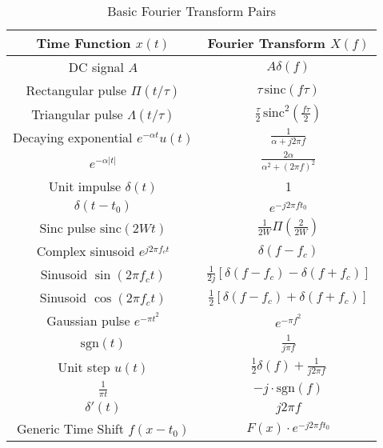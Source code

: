 \documentclass[10pt]{article}
\begin{document}
\begin{table}[h!]
    \centering
    \renewcommand{\arraystretch}{1.5}
    \begin{tabular}{c|c}
        \hline
        \textbf{Time Function \( x(t) \)} & \textbf{Fourier Transform \( X(f) \)} \\
        \hline
        DC signal \( A \) & \( A \delta(f) \) \\
        \hline
        Rectangular pulse \( \Pi(t/\tau) \) & \( \tau \, \text{sinc}(f \tau) \) \\
        \hline
        Triangular pulse \( \Lambda(t/\tau) \) & \( \frac{\tau}{2} \, \text{sinc}^2\left(\frac{f \tau}{2}\right) \) \\
        \hline
        Decaying exponential \( e^{-\alpha t} u(t) \) & \( \frac{1}{\alpha + j2\pi f} \) \\
        \hline
        \( e^{-\alpha |t|} \) & \( \frac{2\alpha}{\alpha^2 + (2\pi f)^2} \) \\
        \hline
        Unit impulse \( \delta(t) \) & 1 \\
        \hline
        \( \delta(t - t_0) \) & \( e^{-j2\pi f t_0} \) \\
        \hline
        Sinc pulse \( \text{sinc}(2Wt) \) & \( \frac{1}{2W} \Pi\left(\frac{2}{2W}\right) \) \\
        \hline
        Complex sinusoid \( e^{j2\pi f_c t} \) & \( \delta(f - f_c) \) \\
        \hline
        Sinusoid \( \sin(2\pi f_c t) \) & \( \frac{1}{2j} [\delta(f - f_c) - \delta(f + f_c)] \) \\
        \hline
        Sinusoid \( \cos(2\pi f_c t) \) & \( \frac{1}{2} [\delta(f - f_c) + \delta(f + f_c)] \) \\
        \hline
        Gaussian pulse \( e^{-\pi t^2} \) & \( e^{-\pi f^2} \) \\
        \hline
        \( \text{sgn}(t) \) & \( \frac{1}{j \pi f} \) \\
        \hline
        Unit step \( u(t) \) & \( \frac{1}{2} \delta(f) + \frac{1}{j2\pi f} \) \\
        \hline
        \( \frac{1}{\pi t} \) & \( -j\cdot\text{sgn}(f) \) \\
        \hline
        \( \delta'(t) \) & \( j2\pi f \) \\
        \hline
        Generic Time Shift $f(x-t_0)$ & $F(x)\cdot e^{-j 2 \pi f t_0}$ \\ 
        \hline
    \end{tabular}
    \caption{Basic Fourier Transform Pairs}
\end{table}
\end{document}
